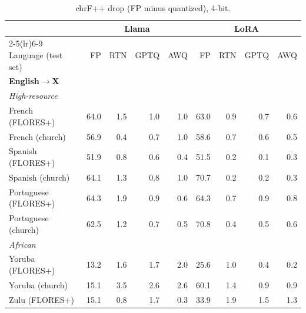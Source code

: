 \begin{table}[htbp]
\centering
\footnotesize
\setlength{\tabcolsep}{3pt}
\caption{chrF++ drop (FP minus quantized), 4-bit.}
\begin{tabular}{lrrrrrrrr}
\toprule
 & \multicolumn{4}{c}{Llama} & \multicolumn{4}{c}{LoRA} \\
\cmidrule(lr){2-5}\cmidrule(lr){6-9}
Language (test set) & FP & RTN & GPTQ & AWQ & FP & RTN & GPTQ & AWQ \\
\midrule
\multicolumn{9}{l}{\textbf{English$\rightarrow$X}} \\ \midrule
\multicolumn{9}{l}{\textit{High-resource}} \\
French (FLORES+) & 64.0 & \cellcolor{loss!15}1.5 & \cellcolor{loss!10}1.0 & \cellcolor{loss!10}1.0 & 63.0 & \cellcolor{loss!8}0.9 & \cellcolor{loss!6}0.7 & \cellcolor{loss!6}0.6 \\
French (church) & 56.9 & \cellcolor{loss!4}0.4 & \cellcolor{loss!7}0.7 & \cellcolor{loss!10}1.0 & 58.6 & \cellcolor{loss!6}0.7 & \cellcolor{loss!6}0.6 & \cellcolor{loss!5}0.5 \\
Spanish (FLORES+) & 51.9 & \cellcolor{loss!8}0.8 & \cellcolor{loss!6}0.6 & \cellcolor{loss!4}0.4 & 51.5 & \cellcolor{loss!2}0.2 & \cellcolor{loss!1}0.1 & \cellcolor{loss!3}0.3 \\
Spanish (church) & 64.1 & \cellcolor{loss!13}1.3 & \cellcolor{loss!8}0.8 & \cellcolor{loss!10}1.0 & 70.7 & \cellcolor{loss!2}0.2 & \cellcolor{loss!2}0.2 & \cellcolor{loss!3}0.3 \\
Portuguese (FLORES+) & 64.3 & \cellcolor{loss!18}1.9 & \cellcolor{loss!9}0.9 & \cellcolor{loss!6}0.6 & 64.3 & \cellcolor{loss!7}0.7 & \cellcolor{loss!8}0.9 & \cellcolor{loss!8}0.8 \\
Portuguese (church) & 62.5 & \cellcolor{loss!11}1.2 & \cellcolor{loss!7}0.7 & \cellcolor{loss!5}0.5 & 70.8 & \cellcolor{loss!4}0.4 & \cellcolor{loss!5}0.5 & \cellcolor{loss!5}0.6 \\
\midrule \multicolumn{9}{l}{\textit{African}} \\
Yoruba (FLORES+) & 13.2 & \cellcolor{loss!15}1.6 & \cellcolor{loss!16}1.7 & \cellcolor{loss!19}2.0 & 25.6 & \cellcolor{loss!9}1.0 & \cellcolor{loss!3}0.4 & \cellcolor{loss!2}0.2 \\
Yoruba (church) & 15.1 & \cellcolor{loss!33}3.5 & \cellcolor{loss!25}2.6 & \cellcolor{loss!25}2.6 & 60.1 & \cellcolor{loss!13}1.4 & \cellcolor{loss!8}0.9 & \cellcolor{loss!9}0.9 \\
Zulu (FLORES+) & 15.1 & \cellcolor{loss!7}0.8 & \cellcolor{loss!16}1.7 & \cellcolor{loss!3}0.3 & 33.9 & \cellcolor{loss!18}1.9 & \cellcolor{loss!14}1.5 & \cellcolor{loss!13}1.3 \\

\end{tabular}
\end{table}
